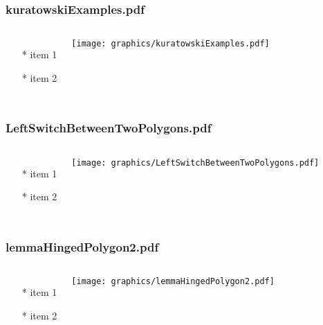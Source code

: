 \documentclass{beamer}
\begin{document}
\begin{frame} \frametitle{kuratowskiExamples.pdf}
    \begin{columns}[c]
        \begin{itemize}
            \item[*] item 1
            \item[*] item 2
        \end{itemize}
        \begin{minipage}{\linewidth}
            \begin{center}
            \texttt{[image: graphics/kuratowskiExamples.pdf]}
            \label{gfx:kuratowskiExamples.pdf}
            \end{center}
        \end{minipage}
    \end{columns}
\end{frame}
\begin{frame} \frametitle{LeftSwitchBetweenTwoPolygons.pdf}
    \begin{columns}[c]
        \begin{itemize}
            \item[*] item 1
            \item[*] item 2
        \end{itemize}
        \begin{minipage}{\linewidth}
            \begin{center}
            \texttt{[image: graphics/LeftSwitchBetweenTwoPolygons.pdf]}
            \label{gfx:LeftSwitchBetweenTwoPolygons.pdf}
            \end{center}
        \end{minipage}
    \end{columns}
\end{frame}
\begin{frame} \frametitle{lemmaHingedPolygon2.pdf}
    \begin{columns}[c]
        \begin{itemize}
            \item[*] item 1
            \item[*] item 2
        \end{itemize}
        \begin{minipage}{\linewidth}
            \begin{center}
            \texttt{[image: graphics/lemmaHingedPolygon2.pdf]}
            \label{gfx:lemmaHingedPolygon2.pdf}
            \end{center}
        \end{minipage}
    \end{columns}
\end{frame}
\end{document}
